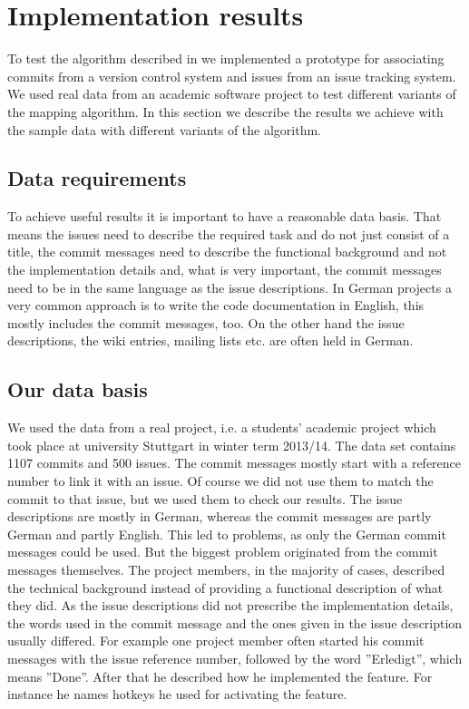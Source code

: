 \section{Implementation results}
\label{sec:implementation_results}
To test the algorithm described in  we implemented a prototype for associating commits from a version control system and issues from an issue tracking system.
We used real data from an academic software project to test different variants of the mapping algorithm.
In this section we describe the results we achieve with the sample data with different variants of the algorithm.

\subsection{Data requirements}
To achieve useful results it is important to have a reasonable data basis.
That means the issues need to describe the required task and do not just consist of a title, the commit messages need to describe the functional background and not the implementation details and, what is very important, the commit messages need to be in the same language as the issue descriptions.
In German projects a very common approach is to write the code documentation in English, this mostly includes the commit messages, too.
On the other hand the issue descriptions, the wiki entries, mailing lists etc. are often held in German.

\subsection{Our data basis}
We used the data from a real project, i.e. a students' academic project which took place at university Stuttgart in winter term 2013/14.
The data set contains 1107 commits and 500 issues.
The commit messages mostly start with a reference number to link it with an issue.
Of course we did not use them to match the commit to that issue, but we used them to check our results.
The issue descriptions are mostly in German, whereas the commit messages are partly German and partly English.
This led to problems, as only the German commit messages could be used.
But the biggest problem originated from the commit messages themselves.
The project members, in the majority of cases, described the technical background instead of providing a functional description of what they did.
As the issue descriptions did not prescribe the implementation details, the words used in the commit message and the ones given in the issue description usually differed.
For example one project member often started his commit messages with the issue reference number, followed by the word ''Erledigt'', which means ''Done''.
After that he described how he implemented the feature.
For instance he names hotkeys he used for activating the feature.

